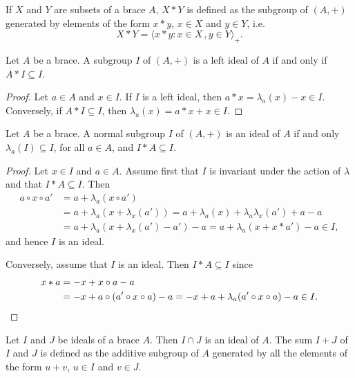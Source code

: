 If $X$ and $Y$ are subsets of a brace $A$, $X*Y$ is defined as the 
subgroup of $(A,+)$ generated by elements of the form $x*y$, $x\in X$ and $y\in Y$, i.e.
\[
X*Y=\langle x*y:x\in X\,,y\in Y\rangle_+.
\]

\begin{proposition}
    \label{pro:A*I}
    Let $A$ be a brace. A subgroup $I$ of $(A,+)$ is 
    a left ideal of $A$ if and only if $A*I\subseteq I$.
\end{proposition}

\begin{proof}
    Let $a\in A$ and $x\in I$. If $I$ is a
    left ideal, then $a*x=\lambda_a(x)-x\in I$. Conversely, if $A*I\subseteq
    I$, then $\lambda_a(x)=a*x+x\in I$.
\end{proof}

\begin{proposition}
    \label{pro:I*A}
    Let $A$ be a brace. A normal subgroup $I$ of $(A,+)$
    is an ideal of $A$ if and only $\lambda_a(I)\subseteq I$, for all $a\in A$, and
    $I*A\subseteq I$.
\end{proposition}

\begin{proof}
    Let $x\in I$ and $a\in A$.  Assume first that $I$ is invariant under the
    action of $\lambda$ and that $I*A\subseteq I$. Then
    \begin{equation}
    \label{eq:trick:I*A}
        \begin{aligned}
        a\circ x\circ a' &=a+\lambda_a(x\circ a')\\
        &=a+\lambda_a(x+\lambda_x(a'))
        =a+\lambda_a(x)+\lambda_a\lambda_x(a')+a-a\\
        &=a+\lambda_a(x+\lambda_x(a')-a')-a
        =a+\lambda_a(x+x*a')-a\in I,
    \end{aligned}
    \end{equation}
    and hence $I$ is an ideal.

    Conversely, assume that $I$ is an ideal. Then $I*A\subseteq I$ since
    \begin{align*}
        x*a&=-x+x\circ a-a\\
        &=-x+a\circ(a'\circ x\circ a)-a
        =-x+a+\lambda_a(a'\circ x\circ a)-a\in I.\qedhere
    \end{align*}
\end{proof}


Let $I$ and $J$ be ideals
of a brace $A$. Then $I\cap J$ is an ideal of $A$.  
The sum $I+J$ of $I$ and $J$ is defined as the
additive subgroup of $A$ generated by all the 
elements of the form
$u+v$, $u\in I$ and $v\in J$. 

